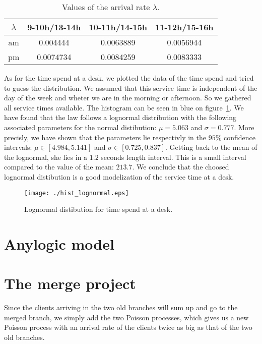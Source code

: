 \documentclass[12pt,a4paper,notitlepage]{report}
\begin{document}
\begin{table}
\centering
\begin{tabular}{|c|c|c|c|}
\hline 
$\lambda$ & 9-10h/13-14h & 10-11h/14-15h & 11-12h/15-16h \\ 
\hline 
am & 0.004444 & 0.0063889 & 0.0056944 \\ 
\hline 
pm & 0.0074734 & 0.0084259 & 0.0083333 \\ 
\hline 
\end{tabular}
\caption{Values of the arrival rate $\lambda$.} 
\end{table}

As for the time spend at a desk, we plotted the data of the time spend and tried to guess the distribution. We assumed that this service time is independent of the day of the week and wheter we are in the morning or afternoon. So we gathered all service times available. The histogram can be seen in blue on figure~\ref{lognormal}. We have found that the law follows a lognormal distribution with the following associated parameters for the normal distibution: $\mu= 5.063$ and $\sigma= 0.777$. More precisly, we have shown that the parameters lie respectivly in the $95 \% $ confidence intervals: $\mu \in [ 4.984 , 5.141 ]$ and $\sigma \in [ 0.725 , 0.837]$. Getting back to the mean of the lognormal, she lies in a $1.2$ seconds length interval. This is a small interval compared to the value of the mean: $ 213.7$. We conclude that the choosed lognormal distibution is a good modelization of the service time at a desk.

\begin{figure}[!h]
\centering
\texttt{[image: ./hist\_lognormal.eps]}
\caption{Lognormal distibution for time spend at a desk.}
\label{lognormal}
\end{figure}


\section*{Anylogic model}


\section*{The merge project}
 Since the clients arriving in the two old branches will sum up and go to the merged branch, we simply add the two Poisson processes, which gives us a new Poisson process with an arrival rate of the clients twice as big as that of the two old branches.
\end{document}
